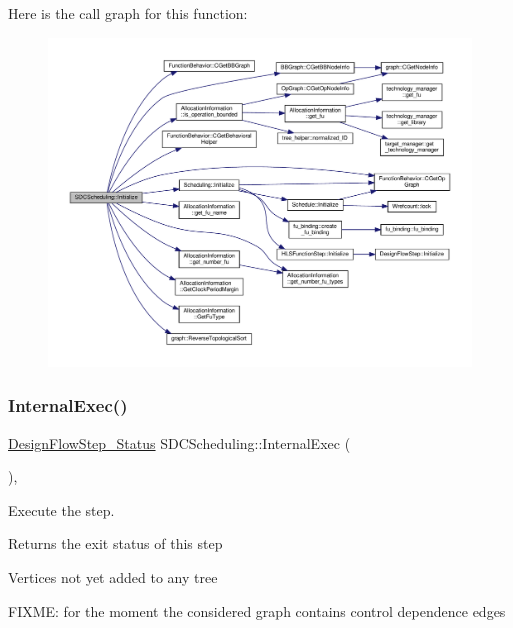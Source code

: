 Here is the call graph for this function\+:
\nopagebreak
\begin{figure}[H]
\begin{center}
\leavevmode
\includegraphics[width=350pt]{d4/dc5/classSDCScheduling_a6776ee26349c16c789a5b2c33c1fa9ff_cgraph}
\end{center}
\end{figure}
\mbox{\label{classSDCScheduling_afd40bf8d626a3ad4f3a6943365933833}} 
\subsubsection{\texorpdfstring{Internal\+Exec()}{InternalExec()}}
{\footnotesize\ttfamily \hyperlink{design__flow__step_8hpp_afb1f0d73069c26076b8d31dbc8ebecdf}{Design\+Flow\+Step\+\_\+\+Status} S\+D\+C\+Scheduling\+::\+Internal\+Exec (\begin{DoxyParamCaption}{ }\end{DoxyParamCaption})\hspace{0.3cm}{\ttfamily [override]}, {\ttfamily [virtual]}}



Execute the step. 

\begin{DoxyReturn}{Returns}
the exit status of this step 
\end{DoxyReturn}
Vertices not yet added to any tree

F\+I\+X\+ME\+: for the moment the considered graph contains control dependence edges

